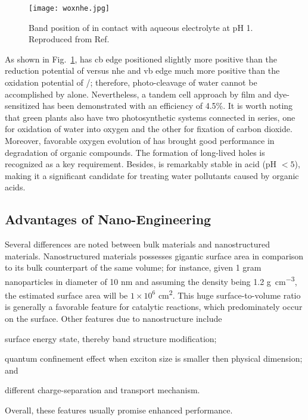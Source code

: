 \begin{figure}[htb]
\centering
\texttt{[image: woxnhe.jpg]}
\caption[Band position of  versus NHE]{Band position of  in contact with aqueous electrolyte at pH 1. Reproduced from Ref.\cite{Gratzel2001}}
\label{fig:woxnhe}
\end{figure}
As shown in Fig.~\ref{fig:woxnhe},  has \gls{cb} edge positioned slightly more positive than the reduction potential of  versus \gls{nhe} and \gls{vb} edge much more positive than the oxidation potential of /; therefore, photo-cleavage of water cannot be accomplished by  alone. Nevertheless, a tandem cell approach by  film and dye-sensitized  has been demonstrated with an efficiency of 4.5\%.\cite{Michael1999} It is worth noting that green plants also have two photosynthetic systems connected in series, one for oxidation of water into oxygen and the other for fixation of carbon dioxide. Moreover, favorable oxygen evolution of  has brought good performance in degradation of organic compounds.\cite{Hepel2001,Luo2001,Watcharenwong2008} The formation of long-lived holes is recognized as a key requirement.\cite{Pesci2011} Besides,  is remarkably stable in acid (pH $<5$), making it a significant candidate for treating water pollutants caused by organic acids.\cite{Monllor-Satoca2006}

\subsection{Advantages of Nano-Engineering}\label{sec:nanoadv}

Several differences are noted between bulk materials and nanostructured materials. Nanostructured materials possesses gigantic surface area in comparison to its bulk counterpart of the same volume; for instance, given 1 gram  nanoparticles in diameter of 10 nm and assuming the density being 1.2 \si{g\per cm^3}, the estimated surface area will be $1\times10^6$ \si{cm^2}. This huge surface-to-volume ratio is generally a favorable feature for catalytic reactions, which predominately occur on the surface.\cite{Sha2009} Other features due to nanostructure include 
\begin{enumerate*}[label=\itshape\alph*\upshape)]
\item surface energy state, thereby band structure modification;
\item quantum confinement effect when exciton size is smaller then physical dimension; and
\item different charge-separation and transport mechanism.
\end{enumerate*} Overall, these features usually promise enhanced performance. 

